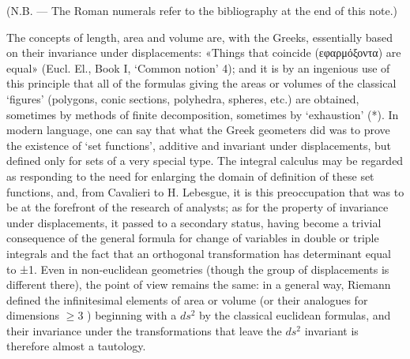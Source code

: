 (N.B. --- The Roman numerals refer to the bibliography at the end of this note.)

The concepts of length, area and volume are, with the Greeks, essentially based on their invariance under displacements: «Things that coincide (εφαρμόξοντα) are equal» (Eucl. El., Book I, `Common notion' 4); and it is by an ingenious use of this principle that all of the formulas giving the areas or volumes of the classical `figures' (polygons, conic sections, polyhedra, spheres, etc.) are obtained, sometimes by methods of finite decomposition, sometimes by `exhaustion' (*). In modern language, one can say that what the Greek geometers did was to prove the existence of `set functions', additive and invariant under displacements, but defined only for sets of a very special type. The integral calculus may be regarded as responding to the need for enlarging the domain of definition of these set functions, and, from Cavalieri to H. Lebesgue, it is this preoccupation that was to be at the forefront of the research of analysts; as for the property of invariance under displacements, it passed to a secondary status, having become a trivial consequence of the general formula for change of variables in double or triple integrals and the fact that an orthogonal transformation has determinant equal to ±1. Even in non-euclidean geometries (though the group of displacements is different there), the point of view remains the same: in a general way, Riemann defined the infinitesimal elements of area or volume (or their analogues for dimensions \(\geqslant3\) ) beginning with a \(ds^{2}\) by the classical euclidean formulas, and their invariance under the transformations that leave the \(ds^{2}\) invariant is therefore almost a tautology.

